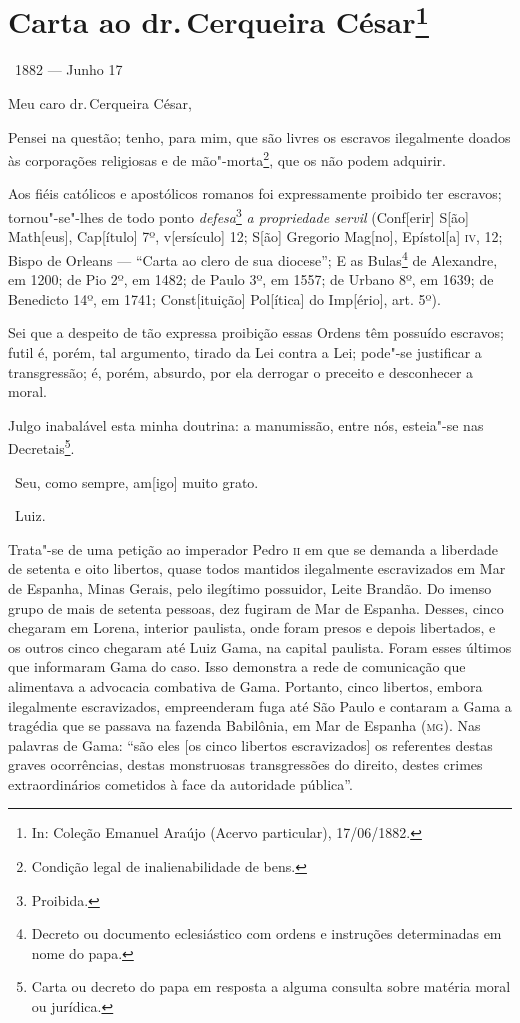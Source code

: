 \chapter{Carta ao dr.\,Cerqueira César\footnote[*]{In: Coleção Emanuel
  Araújo (Acervo particular), 17/06/1882.}}


\hfill\ 1882 --- Junho 17\bigskip

\noindent{}Meu caro dr.\,Cerqueira César,

Pensei na questão; tenho, para mim, que são livres os escravos
ilegalmente doados às corporações religiosas e de mão"-morta\footnote{
  Condição legal de inalienabilidade de bens.}, que os não podem
adquirir.

Aos fiéis católicos e apostólicos romanos foi expressamente proibido ter
escravos; tornou"-se"-lhes de todo ponto \emph{defesa}\footnote{
  Proibida.} \emph{a propriedade servil} (Conf{[}erir{]} S{[}ão{]}
Math{[}eus{]}, Cap{[}ítulo{]} 7º, v{[}ersículo{]} 12; S{[}ão{]} Gregorio
Mag{[}no{]}, Epístol{[}a{]} \textsc{iv}, 12; Bispo de Orleans --- ``Carta ao
clero de sua diocese''; E as Bulas\footnote{Decreto ou documento
  eclesiástico com ordens e instruções determinadas em nome do papa.}
de Alexandre, em 1200; de Pio 2º, em 1482; de Paulo
3º, em 1557; de Urbano 8º, em 1639; de Benedicto 14º, em 1741;
Const{[}ituição{]} Pol{[}ítica{]} do Imp{[}ério{]}, art. 5º).

Sei que a despeito de tão expressa proibição essas Ordens têm possuído
escravos; futil é, porém, tal argumento, tirado da Lei contra a Lei;
pode"-se justificar a transgressão; é, porém, absurdo, por ela derrogar o
preceito e desconhecer a moral.

Julgo inabalável esta minha doutrina: a manumissão, entre nós, esteia"-se
nas Decretais\footnote{Carta ou decreto do papa em resposta a alguma
  consulta sobre matéria moral ou jurídica.}.

\hfill\ Seu, como sempre, am{[}igo{]} muito grato.

\hfill\ Luiz.

\pagebreak
\mbox{}\vfill
\thispagestyle{empty}

{\small\noindent
Trata"-se de uma petição ao imperador Pedro \textsc{ii} em que se demanda a
liberdade de setenta e oito libertos, quase todos mantidos
ilegalmente escravizados em Mar de Espanha, Minas Gerais, pelo ilegítimo
possuidor, Leite Brandão. Do imenso grupo de mais de setenta pessoas,
dez fugiram de Mar de Espanha. Desses, cinco chegaram em Lorena,
interior paulista, onde foram presos e depois libertados, e os
outros cinco chegaram até Luiz Gama, na capital paulista. Foram esses
últimos que informaram Gama do caso. Isso demonstra a rede de comunicação que alimentava a
advocacia combativa de Gama. Portanto, cinco libertos, embora
ilegalmente escravizados, empreenderam fuga até São Paulo e contaram a
Gama a tragédia que se passava na fazenda Babilônia, em Mar de Espanha
(\textsc{mg}). Nas palavras de Gama: ``são eles {[}os cinco libertos
escravizados{]} os referentes destas graves ocorrências, destas
monstruosas transgressões do direito, destes crimes extraordinários
cometidos à face da autoridade pública''. }

